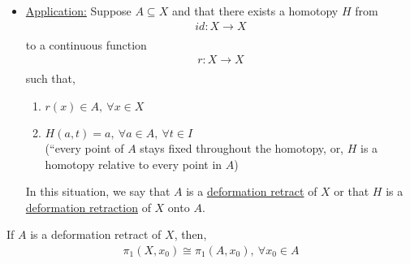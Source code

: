 \documentclass[../notes.tex]{subfiles}
\begin{document}
\begin{itemize}
    \item
        \underline{Application:} Suppose $A\subseteq X$ and that there exists
        a homotopy $H$ from
        \begin{align*}
            id:X\rightarrow X\\
        \end{align*}
        to a continuous function
        \begin{align*}
            r: X\rightarrow X\\
        \end{align*}
        such that,
        \begin{enumerate}
            \item $r(x)\in A,\ \forall x\in X$
            \item $H(a,t)=a,\ \forall a \in A,\ \forall t\in I$\\
                (``every point of $A$ stays fixed throughout the homotopy, or,
                $H$ is a homotopy relative to every point in $A$)
        \end{enumerate}
        In this situation, we say that $A$ is a \underline{deformation retract} of $X$
        or that $H$ is a \underline{deformation retraction} of $X$ onto $A$.
    \end{itemize}
    \begin{theorem} If $A$ is a deformation retract of $X$, then,
        \begin{align*}
            \pi_1(X,x_0)\cong \pi_1(A,x_0),\ \forall x_0\in A\\
        \end{align*}
    \end{theorem}
\end{document}
